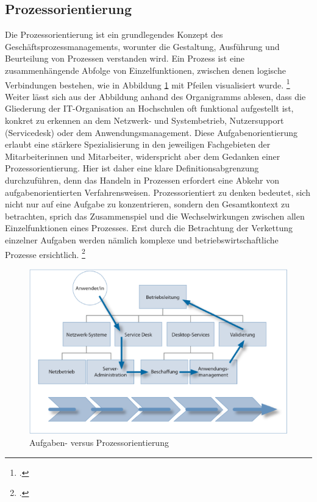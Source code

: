 \subsection{Prozessorientierung}
\label{subsection_prozessorientierung}
Die Prozessorientierung ist ein grundlegendes Konzept des Geschäftsprozessmanagements, worunter die Gestaltung, Ausführung und Beurteilung von Prozessen verstanden wird. Ein Prozess ist eine zusammenhängende Abfolge von Einzelfunktionen, zwischen denen logische Verbindungen bestehen, wie in Abbildung \ref{fig_aufgaben_vs_prozess} mit Pfeilen visualisiert wurde. \footcite[Vgl.][60]{krcmar_einfuhrung_2015} Weiter lässt sich aus der Abbildung anhand des Organigramms ablesen, dass die Gliederung der IT-Organisation an Hochschulen oft funktional aufgestellt ist, konkret zu erkennen an dem Netzwerk- und Systembetrieb, Nutzersupport (Servicedesk) oder dem Anwendungsmanagement. Diese Aufgabenorientierung erlaubt eine stärkere Spezialisierung in den jeweiligen Fachgebieten der Mitarbeiterinnen und Mitarbeiter, widerspricht aber dem Gedanken einer Prozessorientierung. Hier ist daher eine klare Definitionsabgrenzung durchzuführen, denn das Handeln in Prozessen erfordert eine Abkehr von aufgabenorientierten Verfahrensweisen. Prozessorientiert zu denken bedeutet, sich nicht nur auf eine Aufgabe zu konzentrieren, sondern den Gesamtkontext zu betrachten, sprich das Zusammenspiel und die Wechselwirkungen zwischen allen Einzelfunktionen eines Prozesses. Erst durch die Betrachtung der Verkettung einzelner Aufgaben werden nämlich komplexe und betriebswirtschaftliche Prozesse ersichtlich. \footcite[Vgl.][274]{heinrich_stelzer_2011}


\begin{figure}[h!]
	\centering
	\includegraphics[width=15cm]{kapitel/gruppe1_2/bilder/aufgaben-versus_prozessorientierung} 
	\caption{Aufgaben- versus Prozessorientierung\protect\footnotemark}
	\label{fig_aufgaben_vs_prozess}
\end{figure}


